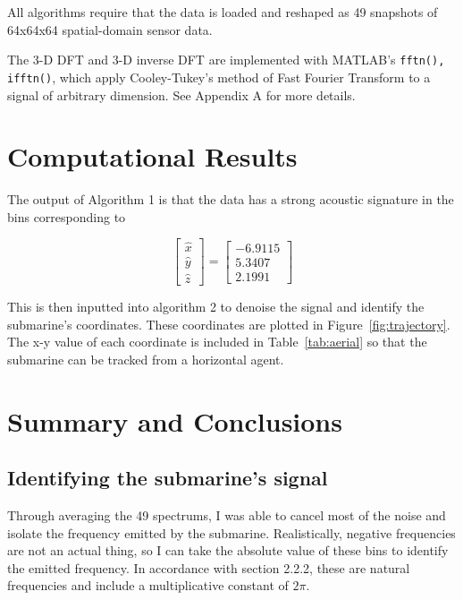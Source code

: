 \documentclass{article}
\begin{document}
All algorithms require that the data is loaded and reshaped as 49 snapshots of 64x64x64 spatial-domain sensor data.


The 3-D DFT and 3-D inverse DFT are implemented with MATLAB's \texttt{fftn(), ifftn()}, which apply Cooley-Tukey's method of Fast Fourier Transform to a signal of arbitrary dimension. See Appendix A for more details.

\section{Computational Results}

The output of Algorithm 1 is that the data has a strong acoustic signature in the bins corresponding to




\begin{equation}
\begin{bmatrix}
	\hat{x} \\ \hat{y} \\ \hat{z}
\end{bmatrix} = \begin{bmatrix}
-6.9115 \\ 5.3407 \\ 2.1991
\end{bmatrix}
\label{eqn:bins}
\end{equation}

This is then inputted into algorithm 2 to denoise the signal and identify the submarine's coordinates. These coordinates are plotted in Figure~\ref{fig:trajectory}. The x-y value of each coordinate is included in Table~\ref{tab:aerial} so that the submarine can be tracked from a horizontal agent. 





\section{Summary and Conclusions}
\subsection{Identifying the submarine's signal}
Through averaging the 49 spectrums, I was able to cancel most of the noise and isolate the frequency emitted by the submarine. Realistically, negative frequencies are not an actual thing, so I can take the absolute value of these bins to identify the emitted frequency. In accordance with section 2.2.2, these are natural frequencies and include a multiplicative constant of $2\pi$. 
\end{document}
